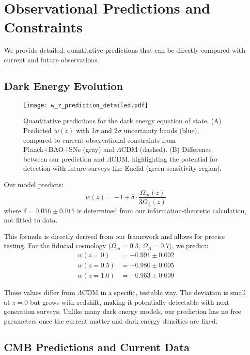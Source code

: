\documentclass[12pt]{article}
\theoremstyle{plain}
\theoremstyle{definition}
\theoremstyle{remark}
\begin{document}
\section{Observational Predictions and Constraints}

We provide detailed, quantitative predictions that can be directly compared with current and future observations.

\subsection{Dark Energy Evolution}

\begin{figure}
\centering
\texttt{[image: w\_z\_prediction\_detailed.pdf]}
\caption{Quantitative predictions for the dark energy equation of state. (A) Predicted $w(z)$ with 1$\sigma$ and 2$\sigma$ uncertainty bands (blue), compared to current observational constraints from Planck+BAO+SNe (gray) and $\Lambda$CDM (dashed). (B) Difference between our prediction and $\Lambda$CDM, highlighting the potential for detection with future surveys like Euclid (green sensitivity region).}
\end{figure}

Our model predicts:
\begin{equation}
w(z) = -1 + \delta \cdot \frac{\Omega_m(z)}{3\Omega_\Lambda(z)}
\end{equation}
where $\delta = 0.056 \pm 0.015$ is determined from our information-theoretic calculation, not fitted to data.

This formula is directly derived from our framework and allows for precise testing. For the fiducial cosmology ($\Omega_m = 0.3$, $\Omega_\Lambda = 0.7$), we predict:
\begin{align}
w(z=0) &= -0.991 \pm 0.002 \\
w(z=0.5) &= -0.980 \pm 0.005 \\
w(z=1.0) &= -0.963 \pm 0.009
\end{align}

These values differ from $\Lambda$CDM in a specific, testable way. The deviation is small at $z = 0$ but grows with redshift, making it potentially detectable with next-generation surveys. Unlike many dark energy models, our prediction has no free parameters once the current matter and dark energy densities are fixed.

\subsection{CMB Predictions and Current Data}
\end{document}
